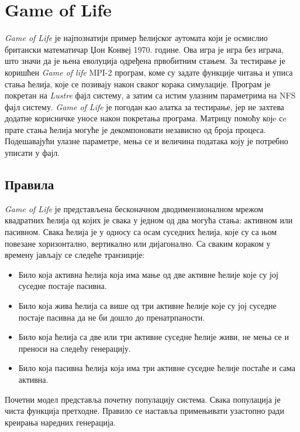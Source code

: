 \section{Game of Life}
\textit{Game of Life} је најпознатији пример ћелијског аутомата који је осмислио британски математичар Џон Конвеј 1970. године. Ова игра је игра без играча, што значи да је њена еволуција одређена првобитним стањем. 
За тестирање је коришћен \textit{Game of life} MPI-2 програм, коме су задате функције читања и уписа стања ћелија, које се позивају након сваког корака симулације. Програм је покретан на \textit{Lustre} фајл систему, а затим са истим улазним параметрима на NFS фајл систему. \textit{Game of Life} је погодан као алатка за тестирање, јер не захтева додатне корисничке уносе након покретања програма. Матрицу помоћу којe сe прате стања ћелија могуће је декомпоновати независно од броја процеса. Подешавајући улазне параметре, мења се и величина података коју је потребно уписати у фајл.

\subsection{Правила}
\textit{Game of Life} је представљена бесконачном дводимензионалном мрежом квадратних ћелија од којих је свака у једном од два могућа стања: активном или пасивном. Свака ћелија је у односу са осам суседних ћелија, које су са њом повезане хоризонтално, вертикално или дијагонално. Са сваким кораком у времену јављају се следеће транзиције:

\begin{itemize}
\item Било која активна ћелија која има мање од две активне ћелије које су јој суседне постаје пасивна.
\item Било која жива ћелија са више од три активне ћелије које су јој суседне постаје пасивна да не би дошло до пренатрпаности.
\item Било која ћелија са две или три активне суседне ћелије живи, не мења се и преноси на следећу генерацију.
\item Било која пасивна ћелија која има три активне суседне ћелије постаће и сама активна.
\end{itemize}

Почетни модел представља почетну популацију система. Свака популација је чиста функција претходне. Правило се наставља примењивати узастопно ради креирања наредних генерација.

